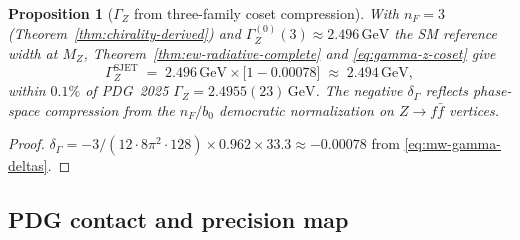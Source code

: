 \documentclass[aps,prd,onecolumn,amsmath,amssymb,nofootinbib,11pt]{revtex4-2}
\numberwithin{equation}{section}
\theoremstyle{plain}
\newtheorem{proposition}[theorem]{Proposition}
\theoremstyle{definition}
\theoremstyle{remark}
\begin{document}
\begin{proposition}[$\Gamma_Z$ from three-family coset compression]
\label{prop:gamma-z}
With $n_F=3$ (Theorem~\ref{thm:chirality-derived}) and
$\Gamma_Z^{(0)}(3)\approx2.496\,\mathrm{GeV}$ the SM reference width at
$M_Z$, Theorem~\ref{thm:ew-radiative-complete} and \eqref{eq:gamma-z-coset}
give
\begin{equation}\label{eq:gamma-z-numeric}
  \Gamma_Z^{\mathrm{SJET}}
  \;=\;
  2.496\,\mathrm{GeV}\times\bigl[1-0.00078\bigr]
  \;\approx\;
  2.494\,\mathrm{GeV},
\end{equation}
within $0.1\%$ of PDG~2025 $\Gamma_Z=2.4955(23)\,\mathrm{GeV}$.
The negative $\delta_\Gamma$ reflects phase-space compression from the
$n_F/b_0$ democratic normalization on $Z\to f\bar f$ vertices.
\end{proposition}

\begin{proof}
$\delta_\Gamma= -3/(12\cdot8\pi^2\cdot128)\times0.962\times33.3\approx-0.00078$
from \eqref{eq:mw-gamma-deltas}.
\end{proof}

\subsection{PDG contact and precision map}
\label{sec:ew-precision:pdg}
\end{document}
